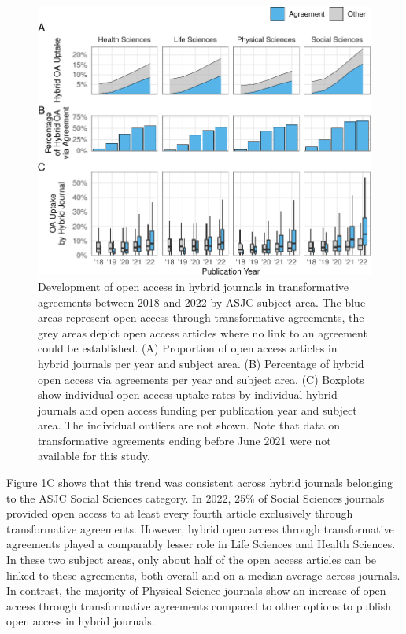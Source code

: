 \documentclass[a4paper,man,floatsintext,longtable,noextraspace,12pt]{apa6}
\begin{document}
\begin{figure}[ht!]

{\centering \includegraphics[width=0.99\linewidth,]{fig/subject_panel-1} 

}

\caption{Development of open access in hybrid journals in transformative agreements between 2018 and 2022 by ASJC subject area. The blue areas represent open access through transformative agreements, the grey areas depict open access articles where no link to an agreement could be established. (A) Proportion of open access articles in hybrid journals per year and subject area. (B) Percentage of hybrid open access via agreements per year and subject area. (C) Boxplots show individual open access uptake rates by individual hybrid journals and open access funding per publication year and subject area. The individual outliers are not shown. Note that data on transformative agreements ending before June 2021 were not available for this study.}\label{fig:subject_panel}
\end{figure}

Figure \ref{fig:subject_panel}C shows that this trend was consistent
across hybrid journals belonging to the ASJC Social Sciences category.
In 2022, 25\% of Social Sciences journals provided open access to at
least every fourth article exclusively through transformative
agreements. However, hybrid open access through transformative
agreements played a comparably lesser role in Life Sciences and Health
Sciences. In these two subject areas, only about half of the open access
articles can be linked to these agreements, both overall and on a median
average across journals. In contrast, the majority of Physical Science
journals show an increase of open access through transformative
agreements compared to other options to publish open access in hybrid
journals.
\end{document}
